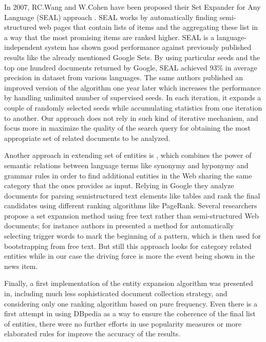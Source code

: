 \documentclass{llncs}
\begin{document}
In 2007, RC.Wang and W.Cohen have been proposed their Set Expander for Any Language (SEAL) approach \cite{Wang2007}. SEAL works by automatically finding semi-structured web pages that contain lists of items and the aggregating these list in a way that the most promising items are ranked higher. SEAL is a language-independent system has shown good performance against previously published results like the already mentioned Google Sets. By using particular seeds and the top one hundred documents returned by Google, SEAL achieved 93\% in average precision in dataset from various languages. The same authors published an improved version of the algorithm one year later\cite{Wang2008} which increases the performance by handling unlimited number of supervised seeds. In each iteration, it expands a couple of randomly selected seeds while accumulating statistics from one iteration to another. Our approach does not rely in such kind of iterative mechanism, and focus more in maximize the quality of the search query for obtaining the most appropriate set of related documents to be analyzed.
 
Another approach in extending set of entities is \cite{Mai-Vu2010}, which combines the power of semantic relations between language terms like synonymy and hyponymy and grammar rules in order to find additional entities in the Web sharing the same category that the ones provides as input. Relying in Google they analyze documents for parsing semistructured text elements like tables and rank the final candidates using different ranking algorithms like PageRank. Several researchers propose a set expansion method using free text rather than semi-structured Web documents; for instance authors in \cite{Talukdar2006} presented a method for automatically selecting trigger words to mark the beginning of a pattern, which is then used for bootstrapping from free text. But still this approach looks for category related entities while in our case the driving force is more the event being shown in the news item.

Finally, a first implementation of the entity expansion algorithm was presented in\cite{RedondoGarcia2014}, including much less sophisticated document collection strategy, and considering only one ranking algorithm based on pure frequency. Even there is a first attempt in using DBpedia as a way to ensure the coherence of the final list of entities, there were no further efforts in use popularity measures or more elaborated rules for improve the accuracy of the results.
\end{document}
